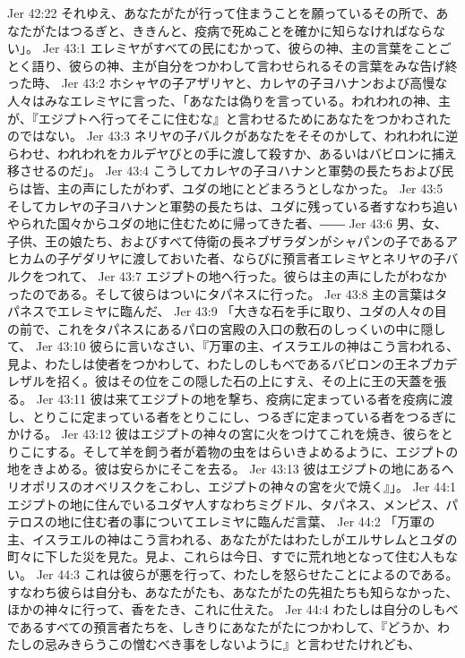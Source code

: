 Jer 42:22  それゆえ、あなたがたが行って住まうことを願っているその所で、あなたがたはつるぎと、ききんと、疫病で死ぬことを確かに知らなければならない」。
Jer 43:1  エレミヤがすべての民にむかって、彼らの神、主の言葉をことごとく語り、彼らの神、主が自分をつかわして言わせられるその言葉をみな告げ終った時、
Jer 43:2  ホシャヤの子アザリヤと、カレヤの子ヨハナンおよび高慢な人々はみなエレミヤに言った、「あなたは偽りを言っている。われわれの神、主が、『エジプトへ行ってそこに住むな』と言わせるためにあなたをつかわされたのではない。
Jer 43:3  ネリヤの子バルクがあなたをそそのかして、われわれに逆らわせ、われわれをカルデヤびとの手に渡して殺すか、あるいはバビロンに捕え移させるのだ」。
Jer 43:4  こうしてカレヤの子ヨハナンと軍勢の長たちおよび民らは皆、主の声にしたがわず、ユダの地にとどまろうとしなかった。
Jer 43:5  そしてカレヤの子ヨハナンと軍勢の長たちは、ユダに残っている者すなわち追いやられた国々からユダの地に住むために帰ってきた者、――
Jer 43:6  男、女、子供、王の娘たち、およびすべて侍衛の長ネブザラダンがシャパンの子であるアヒカムの子ゲダリヤに渡しておいた者、ならびに預言者エレミヤとネリヤの子バルクをつれて、
Jer 43:7  エジプトの地へ行った。彼らは主の声にしたがわなかったのである。そして彼らはついにタパネスに行った。
Jer 43:8  主の言葉はタパネスでエレミヤに臨んだ、
Jer 43:9  「大きな石を手に取り、ユダの人々の目の前で、これをタパネスにあるパロの宮殿の入口の敷石のしっくいの中に隠して、
Jer 43:10  彼らに言いなさい、『万軍の主、イスラエルの神はこう言われる、見よ、わたしは使者をつかわして、わたしのしもべであるバビロンの王ネブカデレザルを招く。彼はその位をこの隠した石の上にすえ、その上に王の天蓋を張る。
Jer 43:11  彼は来てエジプトの地を撃ち、疫病に定まっている者を疫病に渡し、とりこに定まっている者をとりこにし、つるぎに定まっている者をつるぎにかける。
Jer 43:12  彼はエジプトの神々の宮に火をつけてこれを焼き、彼らをとりこにする。そして羊を飼う者が着物の虫をはらいきよめるように、エジプトの地をきよめる。彼は安らかにそこを去る。
Jer 43:13  彼はエジプトの地にあるヘリオポリスのオベリスクをこわし、エジプトの神々の宮を火で焼く』」。
Jer 44:1  エジプトの地に住んでいるユダヤ人すなわちミグドル、タパネス、メンピス、パテロスの地に住む者の事についてエレミヤに臨んだ言葉、
Jer 44:2  「万軍の主、イスラエルの神はこう言われる、あなたがたはわたしがエルサレムとユダの町々に下した災を見た。見よ、これらは今日、すでに荒れ地となって住む人もない。
Jer 44:3  これは彼らが悪を行って、わたしを怒らせたことによるのである。すなわち彼らは自分も、あなたがたも、あなたがたの先祖たちも知らなかった、ほかの神々に行って、香をたき、これに仕えた。
Jer 44:4  わたしは自分のしもべであるすべての預言者たちを、しきりにあなたがたにつかわして、『どうか、わたしの忌みきらうこの憎むべき事をしないように』と言わせたけれども、
